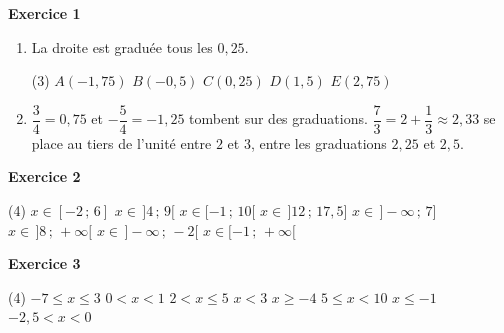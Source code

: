 \documentclass[a4paper,11pt]{article}
\newenvironment{exercice}[1]{%
  \Needspace{6\baselineskip}\par\bigskip\noindent\textbf{Exercice #1}\par\smallskip\noindent\ignorespaces
}{%
  \par
}
\begin{document}
\pagestyle{fancy}
\fancyhf{}
\fancyhead[L]{\Niveau}
\fancyhead[C]{\Chapitre}
\fancyhead[R]{\Document}
\fancyfoot[R]{\thepage\ / \pageref{LastPage}}

\begin{exercice}{1}
\begin{enumerate}[label=\arabic*.]
\item La droite est graduée tous les $0{,}25$.
\begin{tasks}(3)
\task $A(-1{,}75)$
\task $B(-0{,}5)$
\task $C(0{,}25)$
\task $D(1{,}5)$
\task $E(2{,}75)$
\end{tasks}

\item $\dfrac{3}{4} = 0{,}75$ et $-\dfrac{5}{4} = -1{,}25$ tombent sur des graduations. $\dfrac{7}{3} = 2 + \dfrac{1}{3} \approx 2{,}33$ se place au tiers de l'unité entre $2$ et $3$, entre les graduations $2{,}25$ et $2{,}5$.

\begin{center}
\end{center}
\end{enumerate}
\end{exercice}

\begin{exercice}{2}
\begin{tasks}(4)
\task $x\in[-2\,;\,6]$
\task $x\in\,]4\,;\,9[$
\task $x\in[-1\,;\,10[$
\task $x\in\,]12\,;\,17{,}5]$
\task $x\in\,]-\infty\,;\,7]$
\task $x\in\,]8\,;\,+\infty[$
\task $x\in\,]-\infty\,;\,-2[$
\task $x\in[-1\,;\,+\infty[$
\end{tasks}
\end{exercice}

\begin{exercice}{3}
\begin{tasks}(4)
\task $-7\leq x\leq 3$
\task $0<x<1$
\task $2<x\leq 5$
\task $x<3$
\task $x\geq -4$
\task $5\leq x<10$
\task $x\leq -1$
\task $-2{,}5<x<0$
\end{tasks}
\end{exercice}
\end{document}
